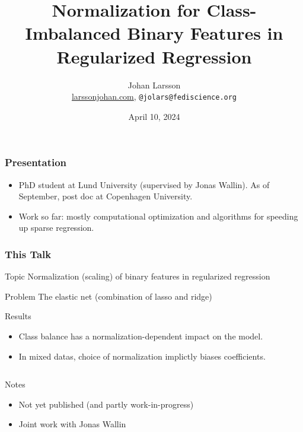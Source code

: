 \documentclass[10pt]{beamer}
\title{Normalization for Class-Imbalanced Binary Features in Regularized Regression}
\author{Johan Larsson\\\smallskip\scriptsize \url{larssonjohan.com}, {\texttt{@jolars@fediscience.org}}}
\institute{Department of Statistics, Lund University}
\date{April 10, 2024}
\begin{document}
\maketitle

\begin{frame}[c]
  \frametitle{Presentation}

  \begin{itemize}
    \item PhD student at Lund University (supervised by Jonas Wallin). As of September, post doc at Copenhagen University.
    \item Work so far: mostly computational optimization and algorithms for speeding up sparse regression.
  \end{itemize}
\end{frame}

\begin{frame}[c]
  \frametitle{This Talk}

  \begin{block}{Topic}
    Normalization (scaling) of binary features in regularized regression
  \end{block}

  \pause

  \begin{alertblock}{Problem}
    The elastic net (combination of lasso and ridge)
  \end{alertblock}

  \pause

  \begin{exampleblock}{Results}
    \begin{itemize}
      \item Class balance has a normalization-dependent impact on the model.
      \item In mixed datas, choice of normalization implictly biases coefficients.
    \end{itemize}
  \end{exampleblock}

  \pause

  \begin{columns}[T]
    \begin{column}{0.45\textwidth}
      \begin{block}{Notes}
        \begin{itemize}
          \item Not yet published (and partly work-in-progress)
          \item Joint work with Jonas Wallin
        \end{itemize}
      \end{block}


\end{column}
\end{columns}
\end{frame}
\end{document}
